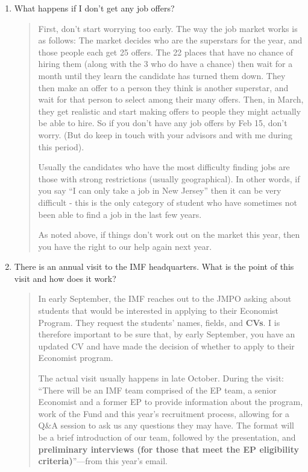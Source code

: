 \documentclass{\classes/econtex}
\begin{document}
\begin{enumerate}
\begin{quote}
    PS.\ Note that employers will pay for the travel of candidates they invite to give job talks. 

  \end{quote}

\item  {} 
  What happens if I don't get any job offers?
  \begin{quote}
    First, don't start worrying too early.  The way the job market works
    is as follows: The market decides who are the superstars for the year, and
    those people each get 25 offers.  The 22 places that have no chance of
    hiring them (along with the 3 who do have a chance) then wait for a
    month until they learn the candidate has turned them down.  They then
    make an offer to a person they think is another superstar, and wait for that person
    to select among their many offers.  Then, in March, they get
    realistic and start making offers to people they might actually be
    able to hire.  So if you don't have any job offers by Feb 15, don't
    worry.  (But do keep in touch with your advisors and with me during this
    period).

    Usually the candidates who have the most difficulty finding jobs are
    those with strong restrictions (usually geographical).  In other
    words, if you say ``I can only take a job in New Jersey'' then it can
    be very difficult - this is the only category of student who 
    have sometimes not been able to find a job in the last few years.

    As noted above, if things don't work out on the market this year, then
    you have the right to our help again next year.

  \end{quote}

\item There is an annual visit to the IMF headquarters. What is the point of this visit and how does it work?

\begin{quote}
	
	In early September, the IMF reaches out to the JMPO asking about students that would be interested in applying to their Economist Program. They request the students' names, fields, and \textbf{CVs}. I is therefore important to be sure that, by early September, you have an updated CV and have made the decision of whether to apply to their Economist program.
	
	The actual visit usually happens in late October. During the visit:
	``There will be an IMF team comprised of the EP team, a senior Economist and a former EP to provide information about the program, work of the Fund and this year's recruitment process, allowing for a Q\&A session to ask us any questions they may have. The format will be a brief introduction of our team, followed by the presentation, and \textbf{preliminary interviews (for those that meet the EP eligibility criteria)}''---from this year's email.
	

\end{quote}
\end{enumerate}
\end{document}
